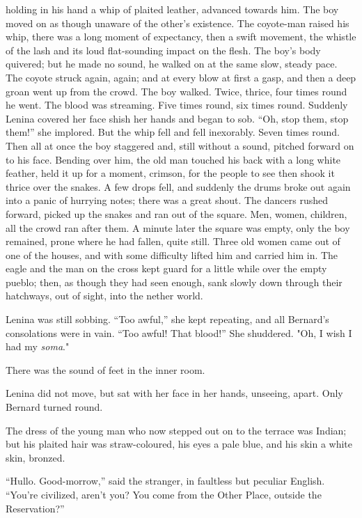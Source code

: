 \documentclass[12pt]{report}
\begin{document}
holding in his hand a whip of plaited leather, advanced towards him. The
boy moved on as though unaware of the other's existence. The coyote-man
raised his whip, there was a long moment of expectancy, then a swift
movement, the whistle of the lash and its loud flat-sounding impact on
the flesh. The boy's body quivered; but he made no sound, he walked on
at the same slow, steady pace. The coyote struck again, again; and at
every blow at first a gasp, and then a deep groan went up from the
crowd. The boy walked. Twice, thrice, four times round he went. The
blood was streaming. Five times round, six times round. Suddenly Lenina
covered her face shish her hands and began to sob. ``Oh, stop them, stop
them!'' she implored. But the whip fell and fell inexorably. Seven times
round. Then all at once the boy staggered and, still without a sound,
pitched forward on to his face. Bending over him, the old man touched
his back with a long white feather, held it up for a moment, crimson,
for the people to see then shook it thrice over the snakes. A few drops
fell, and suddenly the drums broke out again into a panic of hurrying
notes; there was a great shout. The dancers rushed forward, picked up
the snakes and ran out of the square. Men, women, children, all the
crowd ran after them. A minute later the square was empty, only the boy
remained, prone where he had fallen, quite still. Three old women came
out of one of the houses, and with some difficulty lifted him and
carried him in. The eagle and the man on the cross kept guard for a
little while over the empty pueblo; then, as though they had seen
enough, sank slowly down through their hatchways, out of sight, into the
nether world.

Lenina was still sobbing. ``Too awful,'' she kept repeating, and all
Bernard's consolations were in vain. ``Too awful! That blood!'' She
shuddered. "Oh, I wish I had my \emph{soma}."

There was the sound of feet in the inner room.

Lenina did not move, but sat with her face in her hands, unseeing,
apart. Only Bernard turned round.

The dress of the young man who now stepped out on to the terrace was
Indian; but his plaited hair was straw-coloured, his eyes a pale blue,
and his skin a white skin, bronzed.

``Hullo. Good-morrow,'' said the stranger, in faultless but peculiar
English. ``You're civilized, aren't you? You come from the Other Place,
outside the Reservation?''
\end{document}
